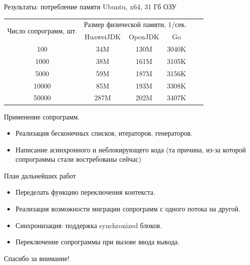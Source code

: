 \begin{frame}{Результаты: потребление памяти}
	Ubuntu, x64, 31 Гб ОЗУ
	\begin{table}[H]
		\begin{tabular}{|c|c|c|c|c|c|}
			\hline \multirow{2}{*}{Число сопрограмм, шт.} & \multicolumn{3}{|c|}{Размер физической памяти, 1/сек.}    \\
			\cline{2-4}    & HuaweiJDK & OpenJDK  & Go   \\
			\hline 100     & 34M       & 130M     & 3040K  \\
			\hline 1000    & 38M       & 161M     & 3105K  \\
			\hline 5000    & 59M       & 187M     & 3156K  \\
			\hline 10000   & 85M       & 193M     & 3308K \\
			\hline 50000   & 287M      & 202M     & 3407K  \\ 
			\hline 
		\end{tabular}
	\end{table}
\end{frame}


\begin{frame}{Применение сопрограмм.}
	\begin{itemize}
	\item Реализация бесконечных списков, итераторов, генераторов.
	\item Написание асинхронного и неблокирующего кода (та причина, из-за которой сопрограммы стали востребованы сейчас)
	\end{itemize}
\end{frame}

\begin{frame}{План дальнейших работ} 
	\begin{itemize}
	\item Переделать функцию переключения контекста.
	\item Реализация возможности миграции сопрограмм с одного потока на другой.
	\item Синхронизация: поддержка synchronized блоков.
	\item Переключение сопрограммы при вызове ввода вывода.
	\end{itemize}
\end{frame}

\begin{frame}
	\begin{center}
		Спасибо за внимание!
	\end{center}
\end{frame}

